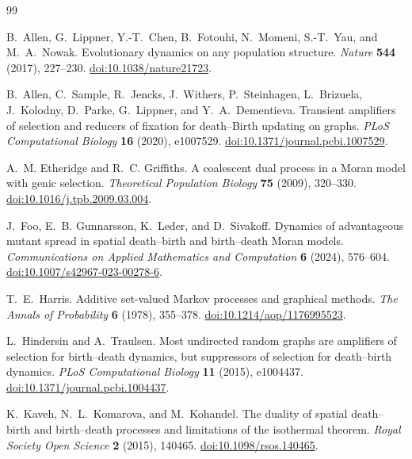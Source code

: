 \begin{thebibliography}{99}
\raggedright

B.~Allen, G.~Lippner, Y.-T.~Chen, B.~Fotouhi, N.~Momeni,
S.-T.~Yau, and M.~A.~Nowak.
Evolutionary dynamics on any population structure.
\emph{Nature} \textbf{544} (2017), 227--230.
\href{https://doi.org/10.1038/nature21723}{doi:10.1038/nature21723}.

B.~Allen, C.~Sample, R.~Jencks, J.~Withers, P.~Steinhagen,
L.~Brizuela, J.~Kolodny, D.~Parke, G.~Lippner, and Y.~A.~Dementieva.
Transient amplifiers of selection and reducers of fixation for death--Birth
updating on graphs.
\emph{PLoS Computational Biology} \textbf{16} (2020), e1007529.
\href{https://doi.org/10.1371/journal.pcbi.1007529}{doi:10.1371/journal.pcbi.1007529}.

A.~M. Etheridge and R.~C. Griffiths.
A coalescent dual process in a Moran model with genic selection.
\emph{Theoretical Population Biology} \textbf{75} (2009), 320--330.
\href{https://doi.org/10.1016/j.tpb.2009.03.004}
{doi:10.1016/j.tpb.2009.03.004}.

J.~Foo, E.~B. Gunnarsson, K.~Leder, and D.~Sivakoff.
Dynamics of advantageous mutant spread in spatial death--birth and
birth--death Moran models.
\emph{Communications on Applied Mathematics and Computation} \textbf{6}
(2024), 576--604.
\href{https://doi.org/10.1007/s42967-023-00278-6}
{doi:10.1007/s42967-023-00278-6}.

T.~E.~Harris.
Additive set-valued Markov processes and graphical methods.
\emph{The Annals of Probability} \textbf{6} (1978), 355--378.
\href{https://doi.org/10.1214/aop/1176995523}
{doi:10.1214/aop/1176995523}.

L.~Hindersin and A.~Traulsen.
Most undirected random graphs are amplifiers of selection for birth--death
dynamics, but suppressors of selection for death--birth dynamics.
\emph{PLoS Computational Biology} \textbf{11} (2015), e1004437.
\href{https://doi.org/10.1371/journal.pcbi.1004437}{doi:10.1371/journal.pcbi.1004437}.

K.~Kaveh, N.~L.~Komarova, and M.~Kohandel.
The duality of spatial death--birth and birth--death processes and limitations
of the isothermal theorem.
\emph{Royal Society Open Science} \textbf{2} (2015), 140465.
\href{https://doi.org/10.1098/rsos.140465}{doi:10.1098/rsos.140465}.


\end{thebibliography}

